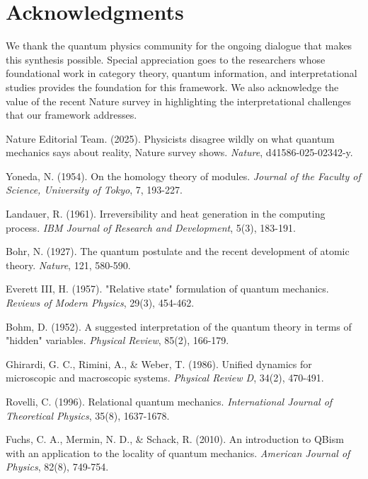 \documentclass[12pt,a4paper]{article}
\begin{document}
\section*{Acknowledgments}

We thank the quantum physics community for the ongoing dialogue that makes this synthesis possible. Special appreciation goes to the researchers whose foundational work in category theory, quantum information, and interpretational studies provides the foundation for this framework. We also acknowledge the value of the recent Nature survey in highlighting the interpretational challenges that our framework addresses.

\begin{thebibliography}{99}
Nature Editorial Team. (2025). Physicists disagree wildly on what quantum mechanics says about reality, Nature survey shows. \textit{Nature}, d41586-025-02342-y.

Yoneda, N. (1954). On the homology theory of modules. \textit{Journal of the Faculty of Science, University of Tokyo}, 7, 193-227.

Landauer, R. (1961). Irreversibility and heat generation in the computing process. \textit{IBM Journal of Research and Development}, 5(3), 183-191.

Bohr, N. (1927). The quantum postulate and the recent development of atomic theory. \textit{Nature}, 121, 580-590.

Everett III, H. (1957). "Relative state" formulation of quantum mechanics. \textit{Reviews of Modern Physics}, 29(3), 454-462.

Bohm, D. (1952). A suggested interpretation of the quantum theory in terms of "hidden" variables. \textit{Physical Review}, 85(2), 166-179.

Ghirardi, G. C., Rimini, A., \& Weber, T. (1986). Unified dynamics for microscopic and macroscopic systems. \textit{Physical Review D}, 34(2), 470-491.

Rovelli, C. (1996). Relational quantum mechanics. \textit{International Journal of Theoretical Physics}, 35(8), 1637-1678.

Fuchs, C. A., Mermin, N. D., \& Schack, R. (2010). An introduction to QBism with an application to the locality of quantum mechanics. \textit{American Journal of Physics}, 82(8), 749-754.


\end{thebibliography}
\end{document}
